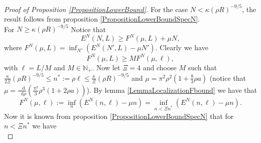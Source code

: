 \documentclass[a4paper,11pt]{article}
\newcommand*\diff{\mathop{}\!\mathrm{d}}
\numberwithin{equation}{section}
\begin{document}
		\begin{proof}[Proof of Proposition \ref{PropositionLowerBound}]
			For the case $ N<\kappa (\rho R)^{-9/5} $, the result follows from proposition \ref{PropositionLowerBoundSpecN}.\\
			For $ N\geq \kappa (\rho R)^{-9/5} $
			Notice that \begin{equation}
			E^N(N,L)\geq F^N(\mu,L)+\mu N,
			\end{equation}
			where $ F^N(\mu,L)=\inf_{N'}\left(E^N(N',L)-\mu N'\right) $. Clearly we have \begin{equation}
			F^N(\mu,L)\geq M F^N(\mu,\ell)\label{EqLocalizationF},
			\end{equation}
			with $ \ell=L/M $ and $ M\in \mathbb{N}_+ $. 
			Now let $\Xi= 4 $ and choose $ M $ such that $ \frac{\kappa}{2\Xi}\left(\rho R\right)^{-9/5}\leq n^*:=\rho\ell\leq \frac{\kappa}{\Xi}\left(\rho R\right)^{-9/5} $ and $ \mu=\pi^2\rho^2\left(1+\frac{8}{3}\rho a\right) $ (notice that $ \mu=\frac{\diff}{\diff \rho}(\frac{\pi^2}{3}\rho^3(1+2\rho a))$). By lemma \ref{LemmaLocalizationFbound} we have that \begin{equation}
			F^N(\mu,\ell):=\inf_{n}\left(E^N(n,\ell)-\mu n\right)=\inf_{n<\Xi n^*}\left(E^N(n,\ell)-\mu n\right).
			\end{equation}
			Now it is known from proposition \ref{PropositionLowerBoundSpecN} that for $ n<\Xi n^* $ we have \begin{equation}

\end{equation}
\end{proof}
\end{document}
